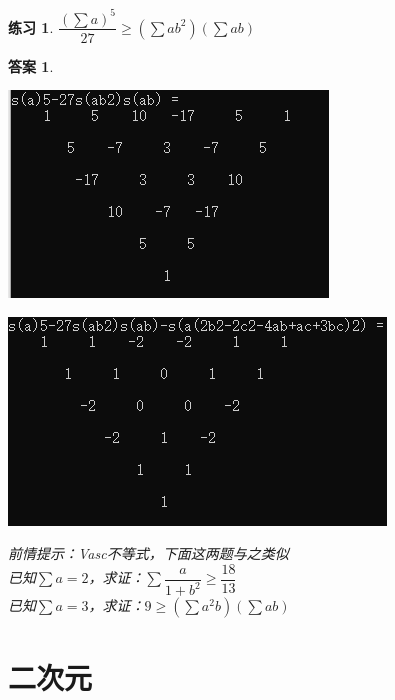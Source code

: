 \documentclass[UTF8]{ctexart}
\newtheorem{3}{练习}
\newtheorem{4}{答案}
\begin{document}
\begin{3}
	$ \dfrac{(\displaystyle \sum a)^{5}}{27} \geq (\displaystyle \sum ab^{2})(\displaystyle \sum ab)$
\end{3}
\begin{4}
	\begin{center}
		\includegraphics[width=0.5\linewidth]{34}
	\end{center}
	\begin{center}
		\includegraphics[width=0.5\linewidth]{35}
	\end{center}
	前情提示：Vasc不等式，下面这两题与之类似\\
	已知$ \displaystyle \sum a=2 $，求证：$\displaystyle \sum  \dfrac{a}{1+b^{2}}\geq \dfrac{18}{13} $\\
	已知$ \displaystyle \sum a=3 $，求证：$ 9\geq (\displaystyle \sum a^{2}b)(\displaystyle \sum ab) $
\end{4}
\section{二次元}
\end{document}

